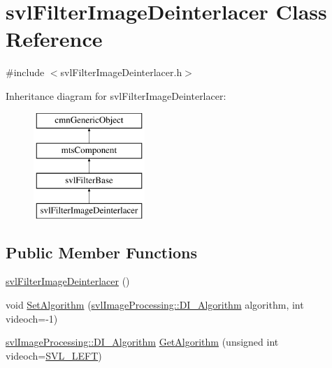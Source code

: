 \hypertarget{classsvl_filter_image_deinterlacer}{\section{svl\-Filter\-Image\-Deinterlacer Class Reference}
\label{classsvl_filter_image_deinterlacer}
}


{\ttfamily \#include $<$svl\-Filter\-Image\-Deinterlacer.\-h$>$}

Inheritance diagram for svl\-Filter\-Image\-Deinterlacer\-:\begin{figure}[H]
\begin{center}
\leavevmode
\includegraphics[height=4.000000cm]{da/d60/classsvl_filter_image_deinterlacer}
\end{center}
\end{figure}
\subsection*{Public Member Functions}
\begin{DoxyCompactItemize}
\item 
\hyperlink{classsvl_filter_image_deinterlacer_aef692af75f210e6fa06810aede1854d7}{svl\-Filter\-Image\-Deinterlacer} ()
\item 
void \hyperlink{classsvl_filter_image_deinterlacer_a9cbbfe94226c2bfe09d5b69d827d6d23}{Set\-Algorithm} (\hyperlink{namespacesvl_image_processing_a52b75591f8aa2cf8a2b4ea843b2f864a}{svl\-Image\-Processing\-::\-D\-I\-\_\-\-Algorithm} algorithm, int videoch=-\/1)
\item 
\hyperlink{namespacesvl_image_processing_a52b75591f8aa2cf8a2b4ea843b2f864a}{svl\-Image\-Processing\-::\-D\-I\-\_\-\-Algorithm} \hyperlink{classsvl_filter_image_deinterlacer_a850fb4dc6fbeee2708f96c52fe8ccf60}{Get\-Algorithm} (unsigned int videoch=\hyperlink{svl_definitions_8h_ab9fec7615f19c8df2919eebcab0b187f}{S\-V\-L\-\_\-\-L\-E\-F\-T})
\end{DoxyCompactItemize}
